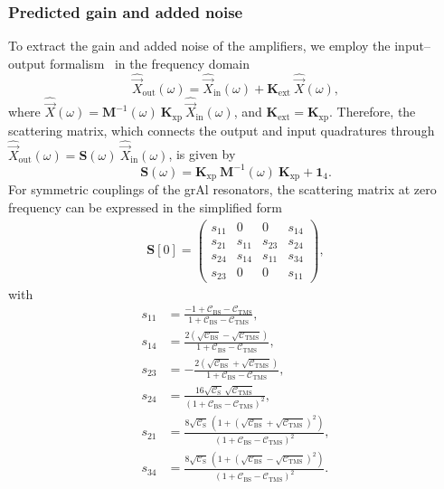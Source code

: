 \documentclass[%
reprint,
floatfix,
superscriptaddress,
amsmath,amssymb,
aps,
pra,
]{revtex4-2}
\newcommand*{\scrpt}[1]{\mathrm{#1}}
\newcommand*{\s}[1]{\ensuremath{_\scrpt{#1}}}
\begin{document}
\subsubsection{Predicted gain and added noise}
\label{A_Gain_noise}
%
To extract the gain and added noise of the amplifiers, we employ the input–output formalism~\cite{gardinerQuantumNoiseHandbook2004a} in the frequency domain
%
\begin{equation}
\label{Inout_X}
\hat{\vec{X}}\s{out} (\omega) =  \hat{\vec{X}}\s{in} (\omega) + \mathbf{K}\s{ext} \:  \hat{\vec{X}} (\omega),
\end{equation}
%
where $\hat{\vec{X}} (\omega)= \mathbf{M}^{-1} (\omega) \: \mathbf{K}\s{xp} \: \hat{\Vec{X}}\s{in} (\omega)$, and $\mathbf{K}\s{ext} = \mathbf{K}\s{xp}$. Therefore, the scattering matrix, which connects the output and input quadratures through $\hat{\vec{X}}\s{out} (\omega) = \mathbf{S}(\omega) \: \hat{\vec{X}}\s{in} (\omega)$, is given by
%
\begin{equation}
    \label{SM}
    \mathbf{S}(\omega) = \mathbf{K}\s{xp} \: \mathbf{M}^{-1}(\omega) \: \mathbf{K\s{xp}} + \mathbf{1}\s{\mathrm{4}}.
\end{equation}
%
For symmetric couplings of the grAl resonators, the scattering matrix at zero frequency can be expressed in the simplified form
%
\begin{align}
\label{S0}
   \mathbf{S}[0] = \begin{pmatrix}
s\s{11} & 0 & 0 & s\s{14}
\\
s\s{21} & s\s{11} & s\s{23} & s\s{24} 
\\
s\s{24} & s\s{14} & s\s{11} & s\s{34} 
\\
s\s{23} & 0 & 0 & s\s{11}
\end{pmatrix},
\end{align}
%
with
%
\begin{subequations}
\begin{align}
\label{S0_elements}
s\s{11} & = \frac{-1+\mathcal{C}\s{BS}-\mathcal{C}\s{TMS}}{1 + \mathcal{C}\s{BS}-\mathcal{C}\s{TMS}}, \\
s\s{14} & = \frac{2 \left(\sqrt{\mathcal{C}\s{BS}}-\sqrt{\mathcal{C}\s{TMS}} \right)}{1 + \mathcal{C}\s{BS}-\mathcal{C}\s{TMS}}, \\
s\s{23} & = - \frac{2 \left(\sqrt{\mathcal{C}\s{BS}}+\sqrt{\mathcal{C}\s{TMS}} \right)}{1 + \mathcal{C}\s{BS}-\mathcal{C}\s{TMS}}, \\
s\s{24} & = \frac{16 \sqrt{\mathcal{C}\s{S}} \, \sqrt{\mathcal{C}\s{TMS}}}{\left(1 + \mathcal{C}\s{BS}-\mathcal{C}\s{TMS} \right)^2}, \\
s\s{21} & = \frac{8 \sqrt{\mathcal{C}\s{S}} \, \left(1 + \left(\sqrt{\mathcal{C}\s{BS}} + \sqrt{\mathcal{C}\s{TMS}} \right)^2 \right)}{\left(1 + \mathcal{C}\s{BS}-\mathcal{C}\s{TMS} \right)^2}, \\
s\s{34} & = \frac{8 \sqrt{\mathcal{C}\s{S}} \, \left(1 + \left(\sqrt{\mathcal{C}\s{BS}} - \sqrt{\mathcal{C}\s{TMS}} \right)^2 \right)}{\left(1 + \mathcal{C}\s{BS}-\mathcal{C}\s{TMS} \right)^2}.
\end{align}
\end{subequations}
\end{document}
